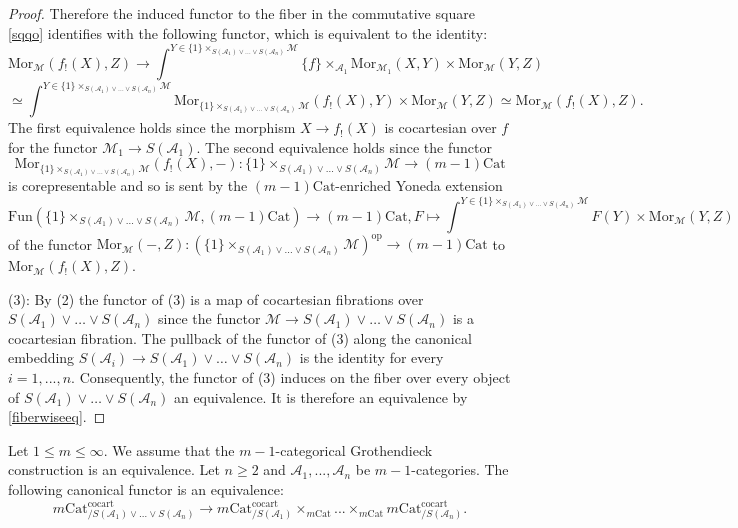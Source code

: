\documentclass[10pt,oneside]{article}
\numberwithin{equation}{section} %
\numberwithin{figure}{section} %
\theoremstyle{plain}
\theoremstyle{definition}
\newcommand{\mA}{{\mathcal A}}
\newcommand{\mM}{{\mathcal M}}
\newcommand{\bi}{{i}}
\newcommand{\m}{{m}}
\newcommand{\n}{{n}}
\newcommand{\op}{\mathrm{op}}
\newcommand{\Cat}{\mathrm{Cat}}
\newcommand{\Fun}{\mathrm{Fun}}
\newcommand{\cocart}{{\mathrm{cocart}}}
\newcommand{\Mor}{{\mathrm{Mor}}}
\begin{document}
\begin{proof}
Therefore the induced functor to the fiber in the commutative square 
\ref{sqqo} identifies with the following functor, which is equivalent to the identity:
$$ \Mor_{\mM}(f_!(X),Z) \to \int^{Y \in \{1\}\times_{S(\mA_1) \vee \ldots \vee S(\mA_n)} \mM} \{f\} \times_{\mA_1}\Mor_{\mM_1}(X,Y) \times \Mor_{\mM}(Y,Z) $$
$$ \simeq \int^{Y \in \{1\}\times_{S(\mA_1) \vee \ldots \vee S(\mA_n)} \mM} \Mor_{\{1\}\times_{S(\mA_1) \vee \ldots \vee S(\mA_n)} \mM}(f_!(X),Y) \times \Mor_{\mM}(Y,Z) \simeq \Mor_{\mM}(f_!(X),Z).$$
The first equivalence holds since the morphism
$X \to f_!(X)$ is cocartesian over $f$ for the functor
$\mM_1 \to S(\mA_1).$
The second equivalence holds since the functor $$\Mor_{\{1\}\times_{S(\mA_1) \vee \ldots \vee S(\mA_n)} \mM}(f_!(X),-): \{1\}\times_{S(\mA_1) \vee \ldots \vee S(\mA_n)} \mM \to (m-1)\Cat $$ is corepresentable and so is sent by the $(m-1)\Cat$-enriched Yoneda extension
$$ \Fun(\{1\}\times_{S(\mA_1) \vee \ldots \vee S(\mA_n)} \mM, (m-1)\Cat) \to (m-1)\Cat , F \mapsto \int^{Y \in \{1\}\times_{S(\mA_1) \vee \ldots \vee S(\mA_n)} \mM} F(Y) \times \Mor_{\mM}(Y,Z) $$ of the 
functor $ \Mor_{\mM}(-,Z): (\{1\}\times_{S(\mA_1) \vee \ldots \vee S(\mA_n)} \mM)^\op \to (m-1)\Cat$ to $\Mor_{\mM}(f_!(X),Z).$ 

\vspace{1mm}
(3): By (2) the functor of (3) is a map of cocartesian fibrations over $S(\mA_1) \vee \ldots \vee S(\mA_n)$ since the functor $\mM \to S(\mA_1) \vee \ldots \vee S(\mA_n)$ is a cocartesian fibration.
The pullback of the functor of (3)
along the canonical embedding $S(\mA_\bi) \to S(\mA_1) \vee \ldots \vee S(\mA_n)$ is the identity for every $\bi=1 ,..., n.$
Consequently, the functor of (3) induces on the fiber over every object of $S(\mA_1) \vee \ldots \vee S(\mA_n)$ an equivalence.
It is therefore an equivalence by \cref{fiberwiseeq}.
\end{proof}

\begin{corollary}\label{Segal}

Let $1 \leq \m \leq \infty.$
We assume that the $m-1$-categorical Grothendieck construction is an equivalence.
Let $\n \geq 2$ and $\mA_1, ..., \mA_n$ be $m-1$-categories.
The following canonical functor is an equivalence:
$$ {m \Cat^\cocart_{/ S(\mA_1) \vee \ldots \vee S(\mA_n)}} \to {m \Cat^\cocart_{/ S(\mA_1)}} \times_{m\Cat} ... \times_{m\Cat} {m\Cat^\cocart_{/ S(\mA_n)}}.$$

\end{corollary}
\end{document}
